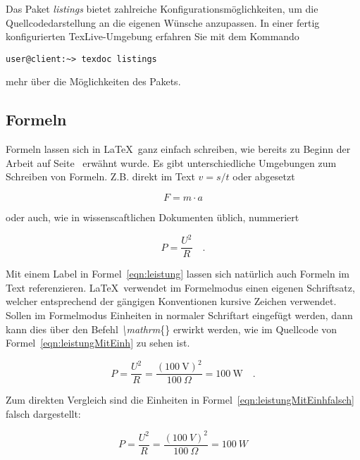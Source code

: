Das Paket \textit{listings} bietet zahlreiche Konfigurationsmöglichkeiten, um die Quellcodedarstellung an die eigenen Wünsche anzupassen. In einer fertig konfigurierten TexLive-Umgebung erfahren Sie mit dem Kommando

\begin{verbatim}
user@client:~> texdoc listings
\end{verbatim}				%

mehr über die Möglichkeiten des Pakets.


\subsection{Formeln}
\label{sec:formeln}

Formeln lassen sich in \LaTeX~ganz einfach schreiben, wie bereits zu Beginn der Arbeit auf Seite~\pageref{cha:Einleitung} erwähnt wurde. Es gibt unterschiedliche Umgebungen zum Schreiben von Formeln. Z.B. direkt im Text $v=s/t$ oder abgesetzt

\[F=m \cdot a\]

oder auch, wie in wissenscaftlichen Dokumenten üblich, nummeriert

\begin{equation}
P=\frac{U^2}{R} \quad .
\label{eqn:leistung}
\end{equation}

Mit einem Label in Formel~\ref{eqn:leistung} lassen sich natürlich auch Formeln im Text referenzieren. \LaTeX~verwendet im Formelmodus einen eigenen Schriftsatz, welcher entsprechend der gängigen Konventionen kursive Zeichen verwendet. Sollen im Formelmodus Einheiten in normaler Schriftart eingefügt werden, dann kann dies über den Befehl \textit{\textbackslash mathrm}\{\} erwirkt werden, wie im Quellcode von Formel~\ref{eqn:leistungMitEinh} zu sehen ist.

\begin{equation}
P=\frac{U^2}{R} = \frac{\left( 100~\mathrm{V}\right)^2}{100~\Omega} = 100~\mathrm{W}\quad .
\label{eqn:leistungMitEinh}
\end{equation}

Zum direkten Vergleich sind die Einheiten in Formel~\ref{eqn:leistungMitEinhfalsch} falsch dargestellt:

\begin{equation}
P=\frac{U^2}{R} = \frac{\left( 100~V\right)^2}{100~\Omega} = 100~W
\label{eqn:leistungMitEinhfalsch}
\end{equation}

